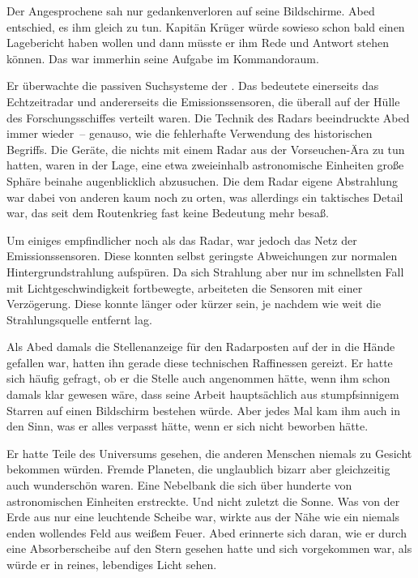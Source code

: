 \par

Der Angesprochene sah nur gedankenverloren auf seine Bildschirme. Abed entschied, es ihm gleich zu tun. Kapitän Krüger würde sowieso schon bald einen Lagebericht haben wollen und dann müsste er ihm Rede und Antwort stehen können. Das war immerhin seine Aufgabe im Kommandoraum.

\par

Er überwachte die passiven Suchsysteme der . Das bedeutete einerseits das Echtzeitradar und andererseits die Emissionssensoren, die überall auf der Hülle des Forschungsschiffes verteilt waren. Die Technik des Radars beeindruckte Abed immer wieder~-- genauso, wie die fehlerhafte Verwendung des historischen Begriffs. Die Geräte, die nichts mit einem Radar aus der Vorseuchen-Ära zu tun hatten, waren in der Lage, eine etwa zweieinhalb astronomische Einheiten große Sphäre beinahe augenblicklich abzusuchen. Die dem Radar eigene Abstrahlung war dabei von anderen kaum noch zu orten, was allerdings ein taktisches Detail war, das seit dem Routenkrieg fast keine Bedeutung mehr besaß.

\par

Um einiges empfindlicher noch als das Radar, war jedoch das Netz der Emissionssensoren. Diese konnten selbst geringste Abweichungen zur normalen Hintergrundstrahlung aufspüren. Da sich Strahlung aber nur im schnellsten Fall mit Lichtgeschwindigkeit fortbewegte, arbeiteten die Sensoren mit einer Verzögerung. Diese konnte länger oder kürzer sein, je nachdem wie weit die Strahlungsquelle entfernt lag.

\par

Als Abed damals die Stellenanzeige für den Radarposten auf der  in die Hände gefallen war, hatten ihn gerade diese technischen Raffinessen gereizt. Er hatte sich häufig gefragt, ob er die Stelle auch angenommen hätte, wenn ihm schon damals klar gewesen wäre, dass seine Arbeit hauptsächlich aus stumpfsinnigem Starren auf einen Bildschirm bestehen würde. Aber jedes Mal kam ihm auch in den Sinn, was er alles verpasst hätte, wenn er sich nicht beworben hätte.

\par

Er hatte Teile des Universums gesehen, die anderen Menschen niemals zu Gesicht bekommen würden. Fremde Planeten, die unglaublich bizarr aber gleichzeitig auch wunderschön waren. Eine Nebelbank die sich über hunderte von astronomischen Einheiten erstreckte. Und nicht zuletzt die Sonne. Was von der Erde aus nur eine leuchtende Scheibe war, wirkte aus der Nähe wie ein niemals enden wollendes Feld aus weißem Feuer. Abed erinnerte sich daran, wie er durch eine Absorberscheibe auf den Stern gesehen hatte und sich vorgekommen war, als würde er in reines, lebendiges Licht sehen.

